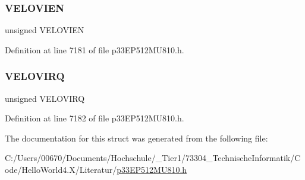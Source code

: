 \mbox{\label{structtag_q_e_i2_s_t_a_t_b_i_t_s_ae01860f2dc36a69ff1e81ce65661c28d}} 
\subsubsection{\texorpdfstring{V\+E\+L\+O\+V\+I\+EN}{VELOVIEN}}
{\footnotesize\ttfamily unsigned V\+E\+L\+O\+V\+I\+EN}



Definition at line 7181 of file p33\+E\+P512\+M\+U810.\+h.

\mbox{\label{structtag_q_e_i2_s_t_a_t_b_i_t_s_ad75eda4eefa6358d4d1d03b82b30ce9c}} 
\subsubsection{\texorpdfstring{V\+E\+L\+O\+V\+I\+RQ}{VELOVIRQ}}
{\footnotesize\ttfamily unsigned V\+E\+L\+O\+V\+I\+RQ}



Definition at line 7182 of file p33\+E\+P512\+M\+U810.\+h.



The documentation for this struct was generated from the following file\+:\begin{DoxyCompactItemize}
\item 
C\+:/\+Users/00670/\+Documents/\+Hochschule/\+\_\+\+Tier1/73304\+\_\+\+Technische\+Informatik/\+Code/\+Hello\+World4.\+X/\+Literatur/\hyperlink{p33_e_p512_m_u810_8h}{p33\+E\+P512\+M\+U810.\+h}\end{DoxyCompactItemize}
